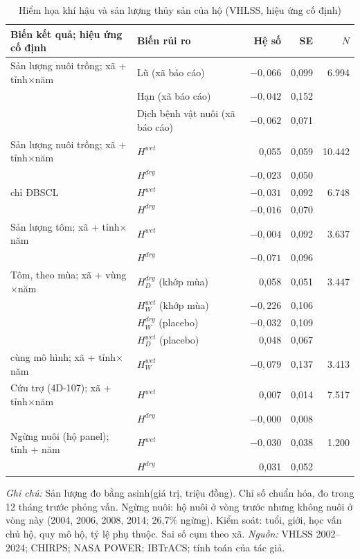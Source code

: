 \documentclass[12pt,a4paper]{article}
\begin{document}
\begin{table}[!tbp]
\centering\footnotesize
\caption{Hiểm họa khí hậu và sản lượng thủy sản của hộ (VHLSS, hiệu ứng cố định)}
\label{tab:hhfe}
\begin{tabular}{@{}llrrr@{}}
\toprule
Biến kết quả; hiệu ứng cố định & Biến rủi ro & Hệ số & SE & $N$ \\
\midrule
Sản lượng nuôi trồng; xã + tỉnh$\times$năm & Lũ (xã báo cáo) & $-0{,}066$ & 0,099 & 6.994 \\
 & Hạn (xã báo cáo) & $-0{,}042$ & 0,152 & \\
 & Dịch bệnh vật nuôi (xã báo cáo) & $-0{,}062$ & 0,071 & \\
Sản lượng nuôi trồng; xã + tỉnh$\times$năm & $H^{wet}$ & 0,055 & 0,059 & 10.442 \\
 & $H^{dry}$ & $-0{,}023$ & 0,050 & \\
\quad chỉ ĐBSCL & $H^{wet}$ & $-0{,}031$ & 0,092 & 6.748 \\
 & $H^{dry}$ & $-0{,}016$ & 0,070 & \\
Sản lượng tôm; xã + tỉnh$\times$năm & $H^{wet}$ & $-0{,}004$ & 0,092 & 3.637 \\
 & $H^{dry}$ & $-0{,}071$ & 0,096 & \\
Tôm, theo mùa; xã + vùng$\times$năm & $H^{dry}_D$ (khớp mùa) & 0,058 & 0,051 & 3.447 \\
 & $H^{wet}_W$ (khớp mùa) & $-0{,}226$ & 0,106 & \\
 & $H^{dry}_W$ (placebo) & $-0{,}032$ & 0,109 & \\
 & $H^{wet}_D$ (placebo) & 0,048 & 0,067 & \\
\quad cùng mô hình; xã + tỉnh$\times$năm & $H^{wet}_W$ & $-0{,}079$ & 0,137 & 3.413 \\
Cứu trợ (4D-107); xã + tỉnh$\times$năm & $H^{wet}$ & 0,007 & 0,014 & 7.517 \\
 & $H^{dry}$ & $-0{,}000$ & 0,008 & \\
Ngừng nuôi (hộ panel); tỉnh + năm & $H^{wet}$ & $-0{,}030$ & 0,038 & 1.200 \\
 & $H^{dry}$ & 0,031 & 0,052 & \\
\bottomrule
\end{tabular}
\begin{minipage}{\textwidth}\footnotesize
\textit{Ghi chú:} Sản lượng đo bằng asinh(giá trị, triệu đồng). Chỉ số chuẩn hóa, đo trong 12 tháng trước phỏng vấn. Ngừng nuôi: hộ nuôi ở vòng trước nhưng không nuôi ở vòng này (2004, 2006, 2008, 2014; 26,7\% ngừng). Kiểm soát: tuổi, giới, học vấn chủ hộ, quy mô hộ, tỷ lệ phụ thuộc. Sai số cụm theo xã. \textit{Nguồn:} VHLSS 2002--2024; CHIRPS; NASA POWER; IBTrACS; tính toán của tác giả.
\end{minipage}
\end{table}
\end{document}
